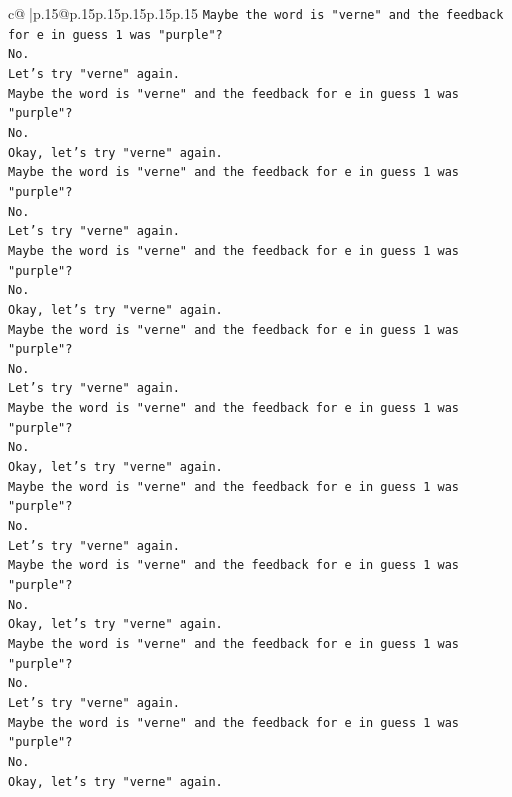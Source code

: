 \documentclass{article}
\begin{document}
{\begin{supertabular}{c@{$\;$}|p{.15\linewidth}@{}p{.15\linewidth}p{.15\linewidth}p{.15\linewidth}p{.15\linewidth}p{.15\linewidth}}
{{{\texttt{Maybe the word is "verne" and the feedback for e in guess 1 was "purple"?} \\
\texttt{No.} \\
\texttt{Let's try "verne" again.} \\
\texttt{Maybe the word is "verne" and the feedback for e in guess 1 was "purple"?} \\
\texttt{No.} \\
\texttt{Okay, let's try "verne" again.} \\
\texttt{Maybe the word is "verne" and the feedback for e in guess 1 was "purple"?} \\
\texttt{No.} \\
\texttt{Let's try "verne" again.} \\
\texttt{Maybe the word is "verne" and the feedback for e in guess 1 was "purple"?} \\
\texttt{No.} \\
\texttt{Okay, let's try "verne" again.} \\
\texttt{Maybe the word is "verne" and the feedback for e in guess 1 was "purple"?} \\
\texttt{No.} \\
\texttt{Let's try "verne" again.} \\
\texttt{Maybe the word is "verne" and the feedback for e in guess 1 was "purple"?} \\
\texttt{No.} \\
\texttt{Okay, let's try "verne" again.} \\
\texttt{Maybe the word is "verne" and the feedback for e in guess 1 was "purple"?} \\
\texttt{No.} \\
\texttt{Let's try "verne" again.} \\
\texttt{Maybe the word is "verne" and the feedback for e in guess 1 was "purple"?} \\
\texttt{No.} \\
\texttt{Okay, let's try "verne" again.} \\
\texttt{Maybe the word is "verne" and the feedback for e in guess 1 was "purple"?} \\
\texttt{No.} \\
\texttt{Let's try "verne" again.} \\
\texttt{Maybe the word is "verne" and the feedback for e in guess 1 was "purple"?} \\
\texttt{No.} \\
\texttt{Okay, let's try "verne" again.} \\
}}}
\end{supertabular}}
\end{document}
